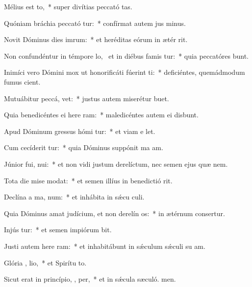 \item Mélius est  to,~* super divítias peccató tas.
\item Quóniam bráchia peccató tur:~* confírmat autem jus minus.
\item Novit Dóminus dies imrum:~* et heréditas eórum in ætér rit.
\item Non confundéntur in témpore lo,~\pscross{} et in diébus famis tur:~* quia peccatóres bunt.
\item Inimíci vero Dómini mox ut honorificáti fúerint  ti:~* deficiéntes, quemádmodum fumus cient.
\item Mutuábitur peccá,   vet:~* justus autem miserétur  buet.
\item Quia benedicéntes ei here ram:~* maledicéntes autem ei disbunt.
\item Apud Dóminum gressus hómi tur:~* et viam e let.
\item Cum cecíderit  tur:~* quia Dóminus suppónit ma am.
\item Júnior fui,  nui:~* et non vidi justum derelíctum, nec semen ejus quæ nem.
\item Tota die mise  modat:~* et semen illíus in benedictió rit.
\item Declína a ma,   num:~* et inhábita in sǽcu culi.
\item Quia Dóminus amat judícium, et non derelín  os:~* in ætérnum consertur.
\item Injús tur:~* et semen impiórum bit.
\item Justi autem here ram:~* et inhabitábunt in sǽculum sǽculi su am.
\item Glória ,  lio,~* et Spirítu to.
\item Sicut erat in princípio,  ,  per,~* et in sǽcula sæculó. men.
